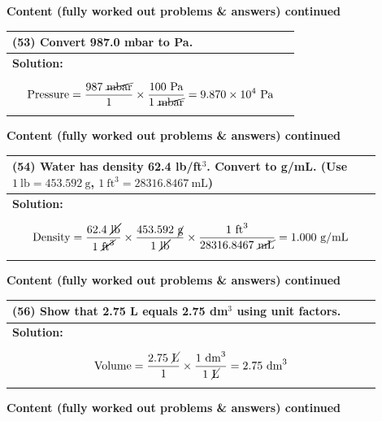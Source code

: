 \documentclass{article}
\begin{document}
\noindent
{\large \textbf{Content (fully worked out problems \& answers) continued}} \\[0.2em]
\begin{tabular}{|p{0.9\linewidth}|}
\hline
\vspace{0.2cm}

\textbf{(53)} Convert 987.0 mbar to Pa. \\
\hline
\textbf{Solution:} \\
\[
\text{Pressure} = \frac{987~\cancel{\text{mbar}}}{1} \times \frac{100~\text{Pa}}{1~\cancel{\text{mbar}}} = 9.870 \times 10^4~\text{Pa}
\]
\\
\hline
\end{tabular}
\newpage
\noindent
{\large \textbf{Content (fully worked out problems \& answers) continued}} \\[0.2em]
\begin{tabular}{|p{0.9\linewidth}|}
\hline
\vspace{0.2cm}

\textbf{(54)} Water has density 62.4 lb/ft$^3$. Convert to g/mL. (Use $1~\text{lb}=453.592~\text{g}$, $1~\text{ft}^3=28316.8467~\text{mL}$) \\
\hline
\textbf{Solution:} \\
\[
\text{Density} = \frac{62.4~\cancel{\text{lb}}}{1~\cancel{\text{ft}^3}} \times \frac{453.592~\cancel{\text{g}}}{1~\cancel{\text{lb}}} \times \frac{1~\text{ft}^3}{28316.8467~\cancel{\text{mL}}} = 1.000~\text{g/mL}
\]
\\
\hline
\end{tabular}

\newpage
\noindent
{\large \textbf{Content (fully worked out problems \& answers) continued}} \\[0.2em]
\begin{tabular}{|p{0.9\linewidth}|}
\hline
\vspace{0.2cm}

\textbf{(56)} Show that 2.75 L equals 2.75 dm$^3$ using unit factors. \\
\hline
\textbf{Solution:} \\
\[
\text{Volume} = \frac{2.75~\cancel{\text{L}}}{1} \times \frac{1~\text{dm}^3}{1~\cancel{\text{L}}} = 2.75~\text{dm}^3
\]
\\
\hline
\end{tabular}
\newpage
\noindent
{\large \textbf{Content (fully worked out problems \& answers) continued}} \\[0.2em]
\end{document}
